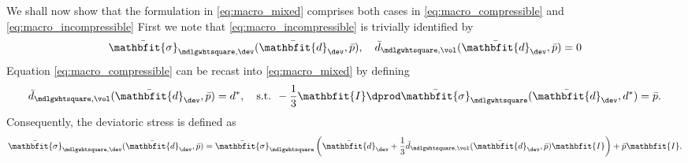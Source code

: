\documentclass[a4paper,11pt]{article}
\renewcommand{\ts}[1]{\mathbfit{#1}}
\renewcommand{\Box}{\mdlgwhtsquare}
\begin{document}
We shall now show that the formulation in \eqref{eq:macro_mixed} comprises both cases in \eqref{eq:macro_compressible} and \eqref{eq:macro_incompressible}
First we note that \eqref{eq:macro_incompressible} is trivially identified by 
\begin{align}
 \bar{\ts\sigma}_{\Box,\dev}(\bar{\ts d}_\dev, \bar p), \quad \bar{d}_{\Box,\vol}(\bar{\ts d}_\dev,\bar p) = 0
\end{align}
Equation \eqref{eq:macro_compressible} can be recast into \eqref{eq:macro_mixed} by defining
\begin{align}
 \bar d_{\Box,\vol}(\bar{\ts d}_\dev, \bar p) = d^*,\quad \text{s.t. } -\frac13 \ts I\dprod \bar{\ts\sigma}_\Box(\bar{\ts d}_\dev, d^*) = \bar p.
\end{align}
Consequently, the deviatoric stress is defined as
\begin{align}
 \bar{\ts\sigma}_{\Box,\dev}(\bar{\ts d}_\dev,\bar p) = \bar{\ts\sigma}_\Box\left(\bar{\ts d}_\dev + \frac13 \bar{d}_{\Box,\vol}(\bar{\ts d}_\dev,\bar p)\ts I\right) + \bar p\ts I.
\end{align}
\end{document}
